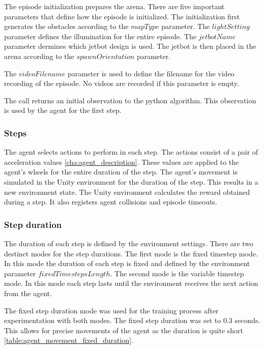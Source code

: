 The episode initialization prepares the arena. There are five important parameters that define how the episode is initialized. The initialization first generates the obstacles according to the $mapType$ parameter. The $lightSetting$ parameter defines the illumination for the entire episode.
The $jetbotName$ parameter dermines which jetbot design is used. The jetbot is then placed in the arena according to the $spawnOrientation$ parameter.

The $videoFilename$ parameter is used to define the filename for the video recording of the episode. No videos are recorded if this parameter is empty.

The call returns an initial observation to the python algorithm. This observation is used by the agent for the first step.

\subsubsection{Steps}

The agent selects actions to perform in each step. The actions consist of a pair of acceleration values \ref{cha:agent_description}. These values are applied to the agent's wheels for the entire duration of the step. The agent's movement is simulated in the Unity environment for the duration of the step. This results in a new environment state.
The Unity environment calculates the reward obtained during a step. It also registers agent collisions and episode timeouts.


\subsubsection{Step duration}
\label{sec:step_duration}

The duration of each step is defined by the environment settings. There are two destinct modes for the step durations. The first mode is the fixed timestep mode. In this mode the duration of each step is fixed and defined by the environment parameter $fixedTimestepsLength$. The second mode is the variable timestep mode. In this mode each step lasts until the environment receives the next action from the agent.

The fixed step duration mode was used for the training process after experimentation with both modes. The fixed step duration was set to 0.3 seconds. This allows for precise movements of the agent as the duration is quite short \ref{table:agent_movement_fixed_duration}.

